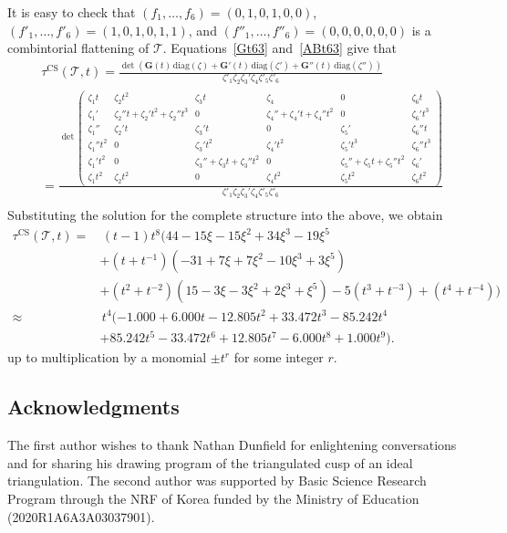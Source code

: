 \documentclass[12pt,reqno]{amsart}
\theoremstyle{definition}
\def\calT{\mathcal T}
\def\CS{\mathrm{CS}}
\def\diag{\mathrm{diag}}
\begin{document}
It is easy to check that $(f_1,\ldots,f_6)=(0,1,0,1,0,0)$,
$(f'_1,\ldots,f'_6)=(1,0,1,0,1,1)$, and $(f''_1,\ldots,f''_6)=(0,0,0,0,0,0)$ is
a combintorial flattening of $\calT$. Equations~\eqref{Gt63} and~\eqref{ABt63}
give that
\begin{align*}
&\tau^{\CS}(\calT,t) =\frac{\det \left( \mathbf{G}(t)\, \diag(\zeta) + 
	\mathbf{G}'(t)\, \diag(\zeta') + 
	\mathbf{G}''(t)\, \diag(\zeta'')\right)
}{\zeta'_1 \zeta_2 \zeta_3' \zeta_4 \zeta'_5 \zeta'_6}\\
&= \frac{\det
\begin{pmatrix}
\zeta_1 t &  \zeta_2 t^2 & \zeta_3 t & \zeta_4 & 0 & \zeta_6 t\\
\zeta_1' & \zeta_2'' t + \zeta_2' t^2 + \zeta_2''t^3 & 0
& \zeta_4''+\zeta_4' t + \zeta_4''t^2  & 0 & \zeta_6' t^3  \\
\zeta_1'' & \zeta_2' t & \zeta_3't & 0 & \zeta_5' & \zeta_6'' t \\
\zeta_1'' t^2 & 0 & \zeta_3' t^2 & \zeta_4' t^2 & \zeta_5' t^3 & \zeta_6'' t^3 \\
\zeta_1' t^2 & 0 & \zeta_3'' + \zeta_3 t + \zeta_3''t^2 & 0
& \zeta_5'' +\zeta_5 t + \zeta_5'' t^2 & \zeta_6'\\
\zeta_1 t^2 & \zeta_2 t^2 & 0& \zeta_4 t^2 & \zeta_5 t^2 & \zeta_6  t^2
\end{pmatrix}
}{\zeta'_1 \zeta_2 \zeta_3' \zeta_4 \zeta'_5 \zeta'_6}\\
\end{align*}
Substituting the solution for the complete structure into the above, we obtain
\begin{align*}
  \tau^{\CS}(\calT,t) = & \, (t-1) t^8 (44 - 15 \xi - 15 \xi^2 + 34 \xi^3 - 19 \xi^5 \\
  & +(t+t^{-1})(-31 + 7 \xi + 7 \xi^2 - 10 \xi^3 + 3 \xi^5) \\
  & +(t^2+t^{-2})(15 - 3 \xi - 3 \xi^2 + 2 \xi^3 + \xi^5)
  -5(t^3+t^{-3}) + (t^4+t^{-4}))
\\
\approx & \, t^4 (-1.000 + 6.000 t - 12.805 t^2 + 33.472 t^3
- 85.242 t^4\\
 & + 85.242 t^5 - 33.472 t^6 + 12.805 t^7 -6.000 t^8 + 1.000 t^9)  .
\end{align*}
up to multiplication by a monomial $\pm t^r$ for some integer $r$.

\subsection*{Acknowledgments}
The first author wishes to thank Nathan Dunfield for enlightening conversations
and for sharing his drawing program of the triangulated cusp of an ideal
triangulation. The second author was supported by Basic Science Research Program
through the NRF of Korea funded by the Ministry of Education (2020R1A6A3A03037901).



%


\end{document}
